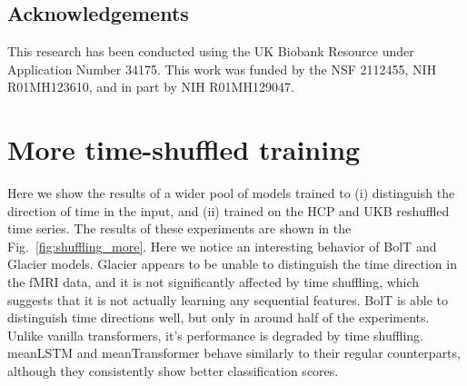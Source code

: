 \documentclass[final,5p,times,twocolumn,authoryear]{elsarticle}
\begin{document}
\subsection*{Acknowledgements}
This research has been conducted using the UK Biobank Resource under Application Number 34175. This work was funded by the NSF 2112455, NIH R01MH123610, and in part by NIH R01MH129047.

\appendix
\section{More time-shuffled training}\label{sec:more_shuffling}
Here we show the results of a wider pool of models trained to (i) distinguish the direction of time in the input, and (ii) trained on the HCP and UKB reshuffled time series. The results of these experiments are shown in the Fig.~\ref{fig:shuffling_more}. Here we notice an interesting behavior of BolT and Glacier models. Glacier appears to be unable to distinguish the time direction in the fMRI data, and it is not significantly affected by time shuffling, which suggests that it is not actually learning any sequential features. BolT is able to distinguish time directions well, but only in around half of the experiments. Unlike vanilla transformers, it's performance is degraded by time shuffling. meanLSTM and meanTransformer behave similarly to their regular counterparts, although they consistently show better classification scores.

 



\end{document}
